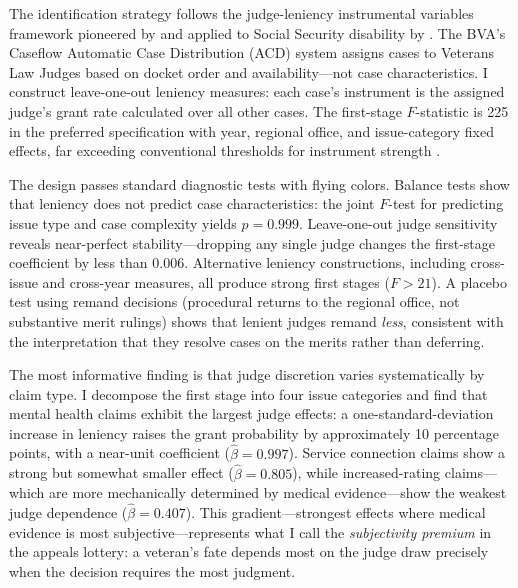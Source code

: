 \documentclass[12pt]{article}
\begin{document}
The identification strategy follows the judge-leniency instrumental variables framework pioneered by \citet{kling2006} and applied to Social Security disability by \citet{maestas2013}. The BVA's Caseflow Automatic Case Distribution (ACD) system assigns cases to Veterans Law Judges based on docket order and availability---not case characteristics. I construct leave-one-out leniency measures: each case's instrument is the assigned judge's grant rate calculated over all other cases. The first-stage $F$-statistic is 225 in the preferred specification with year, regional office, and issue-category fixed effects, far exceeding conventional thresholds for instrument strength \citep{angrist1996}.

The design passes standard diagnostic tests with flying colors. Balance tests show that leniency does not predict case characteristics: the joint $F$-test for predicting issue type and case complexity yields $p = 0.999$. Leave-one-out judge sensitivity reveals near-perfect stability---dropping any single judge changes the first-stage coefficient by less than 0.006. Alternative leniency constructions, including cross-issue and cross-year measures, all produce strong first stages ($F > 21$). A placebo test using remand decisions (procedural returns to the regional office, not substantive merit rulings) shows that lenient judges remand \textit{less}, consistent with the interpretation that they resolve cases on the merits rather than deferring.

The most informative finding is that judge discretion varies systematically by claim type. I decompose the first stage into four issue categories and find that mental health claims exhibit the largest judge effects: a one-standard-deviation increase in leniency raises the grant probability by approximately 10 percentage points, with a near-unit coefficient ($\hat{\beta} = 0.997$). Service connection claims show a strong but somewhat smaller effect ($\hat{\beta} = 0.805$), while increased-rating claims---which are more mechanically determined by medical evidence---show the weakest judge dependence ($\hat{\beta} = 0.407$). This gradient---strongest effects where medical evidence is most subjective---represents what I call the \textit{subjectivity premium} in the appeals lottery: a veteran's fate depends most on the judge draw precisely when the decision requires the most judgment.
\end{document}
